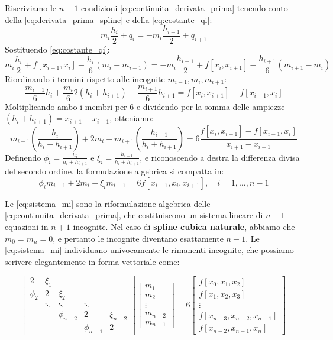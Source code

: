 Riscriviamo le $n-1$ condizioni \eqref{eq:continuita_derivata_prima} tenendo conto della \eqref{eq:derivata_prima_spline} e della \eqref{eq:costante_qi}:
$$ m_i\frac{h_i}{2} + q_i = -m_i\frac{h_{i+1}}{2} + q_{i+1} $$
Sostituendo \eqref{eq:costante_qi}:
$$ m_i\frac{h_i}{2} + f[x_{i-1}, x_i] - \frac{h_i}{6}(m_i - m_{i-1}) = -m_i\frac{h_{i+1}}{2} + f[x_i, x_{i+1}] - \frac{h_{i+1}}{6}(m_{i+1} - m_i) $$
Riordinando i termini rispetto alle incognite $m_{i-1}, m_i, m_{i+1}$:
$$ \frac{m_{i-1}}{6}h_i + \frac{m_i}{6}2(h_i + h_{i+1}) + \frac{m_{i+1}}{6}h_{i+1} = f[x_i, x_{i+1}] - f[x_{i-1}, x_i] $$
Moltiplicando ambo i membri per 6 e dividendo per la somma delle ampiezze $(h_i + h_{i+1}) = x_{i+1} - x_{i-1}$, otteniamo:
$$ m_{i-1}\left(\frac{h_i}{h_i + h_{i+1}}\right) + 2m_i + m_{i+1}\left(\frac{h_{i+1}}{h_i + h_{i+1}}\right) = 6 \frac{f[x_i, x_{i+1}] - f[x_{i-1}, x_i]}{x_{i+1} - x_{i-1}} $$
Definendo $\phi_i = \frac{h_i}{h_i + h_{i+1}}$ e $\xi_i = \frac{h_{i+1}}{h_i + h_{i+1}}$, e riconoscendo a destra la differenza divisa del secondo ordine, la formulazione algebrica si compatta in:
\begin{equation} \label{eq:sistema_mi}
\phi_i m_{i-1} + 2m_i + \xi_i m_{i+1} = 6 f[x_{i-1}, x_i, x_{i+1}], \quad i=1, \dots, n-1
\end{equation}

Le \eqref{eq:sistema_mi} sono la riformulazione algebrica delle \eqref{eq:continuita_derivata_prima}, che costituiscono un sistema lineare di $n-1$ equazioni in $n+1$ incognite. Nel caso di \textbf{spline cubica naturale}, abbiamo che $m_0 = m_n = 0$, e pertanto le incognite diventano esattamente $n-1$.
Le \eqref{eq:sistema_mi} individuano univocamente le rimanenti incognite, che possiamo scrivere elegantemente in forma vettoriale come:

\begin{equation}
\begin{bmatrix}
2 & \xi_1 & & & \\
\phi_2 & 2 & \xi_2 & & \\
& \ddots & \ddots & \ddots & \\
& & \phi_{n-2} & 2 & \xi_{n-2} \\
& & & \phi_{n-1} & 2
\end{bmatrix}
\begin{bmatrix}
m_1 \\ m_2 \\ \vdots \\ m_{n-2} \\ m_{n-1}
\end{bmatrix}
= 6
\begin{bmatrix}
f[x_0, x_1, x_2] \\ f[x_1, x_2, x_3] \\ \vdots \\ f[x_{n-3}, x_{n-2}, x_{n-1}] \\ f[x_{n-2}, x_{n-1}, x_n]
\end{bmatrix}
\end{equation}

